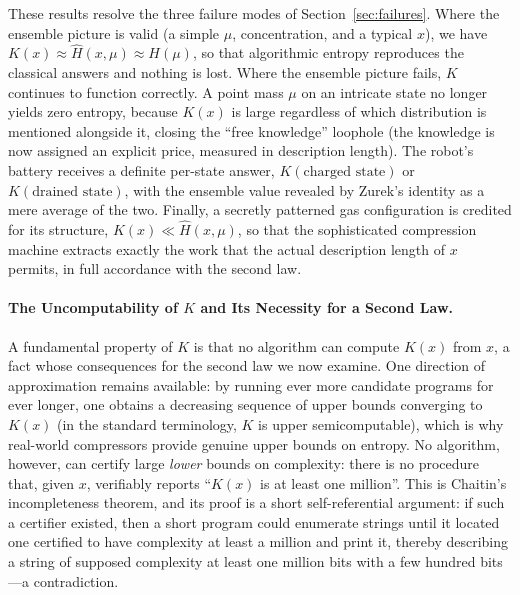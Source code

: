 \documentclass[11pt]{article}
\begin{document}
These results resolve the three failure modes of Section~\ref{sec:failures}. Where the ensemble picture is valid (a simple $\mu$, concentration, and a typical $x$), we have $K(x) \approx \hat H(x,\mu) \approx H(\mu)$, so that algorithmic entropy reproduces the classical answers and nothing is lost. Where the ensemble picture fails, $K$ continues to function correctly. A point mass $\mu$ on an intricate state no longer yields zero entropy, because $K(x)$ is large regardless of which distribution is mentioned alongside it, closing the ``free knowledge'' loophole (the knowledge is now assigned an explicit price, measured in description length). The robot's battery receives a definite per-state answer, $K(\text{charged state})$ or $K(\text{drained state})$, with the ensemble value revealed by Zurek's identity as a mere average of the two. Finally, a secretly patterned gas configuration is credited for its structure, $K(x) \ll \hat H(x,\mu)$, so that the sophisticated compression machine extracts exactly the work that the actual description length of $x$ permits, in full accordance with the second law.

\paragraph{The Uncomputability of $K$ and Its Necessity for a Second Law.} A fundamental property of $K$ is that no algorithm can compute $K(x)$ from $x$, a fact whose consequences for the second law we now examine. One direction of approximation remains available: by running ever more candidate programs for ever longer, one obtains a decreasing sequence of upper bounds converging to $K(x)$ (in the standard terminology, $K$ is upper semicomputable), which is why real-world compressors provide genuine upper bounds on entropy. No algorithm, however, can certify large \emph{lower} bounds on complexity: there is no procedure that, given $x$, verifiably reports ``$K(x)$ is at least one million''. This is Chaitin's incompleteness theorem, and its proof is a short self-referential argument: if such a certifier existed, then a short program could enumerate strings until it located one certified to have complexity at least a million and print it, thereby describing a string of supposed complexity at least one million bits with a few hundred bits---a contradiction.
\end{document}
